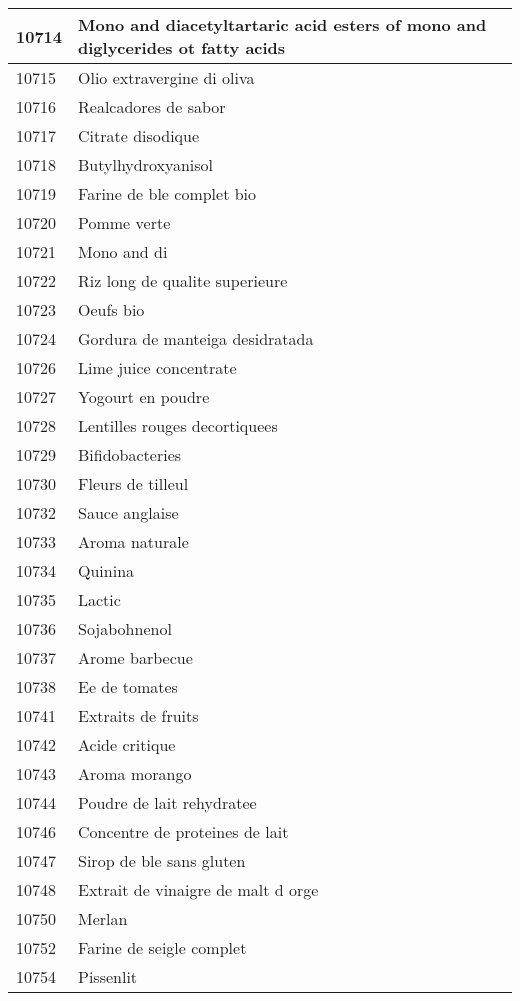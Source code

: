 \begin{longtable}{|l|l|}
10714 & Mono and diacetyltartaric acid esters of mono and diglycerides ot fatty acids \\ \hline 
10715 & Olio extravergine di oliva \\ \hline 
10716 & Realcadores de sabor \\ \hline 
10717 & Citrate disodique \\ \hline 
10718 & Butylhydroxyanisol \\ \hline 
10719 & Farine de ble complet bio \\ \hline 
10720 & Pomme verte \\ \hline 
10721 & Mono and di \\ \hline 
10722 & Riz long de qualite superieure \\ \hline 
10723 & Oeufs bio \\ \hline 
10724 & Gordura de manteiga desidratada \\ \hline 
10726 & Lime juice concentrate \\ \hline 
10727 & Yogourt en poudre \\ \hline 
10728 & Lentilles rouges decortiquees \\ \hline 
10729 & Bifidobacteries \\ \hline 
10730 & Fleurs de tilleul \\ \hline 
10732 & Sauce anglaise \\ \hline 
10733 & Aroma naturale \\ \hline 
10734 & Quinina \\ \hline 
10735 & Lactic \\ \hline 
10736 & Sojabohnenol \\ \hline 
10737 & Arome barbecue \\ \hline 
10738 & Ee de tomates \\ \hline 
10741 & Extraits de fruits \\ \hline 
10742 & Acide critique \\ \hline 
10743 & Aroma morango \\ \hline 
10744 & Poudre de lait rehydratee \\ \hline 
10746 & Concentre de proteines de lait \\ \hline 
10747 & Sirop de ble sans gluten \\ \hline 
10748 & Extrait de vinaigre de malt d orge \\ \hline 
10750 & Merlan \\ \hline 
10752 & Farine de seigle complet \\ \hline 
10754 & Pissenlit \\ \hline 

\end{longtable}
